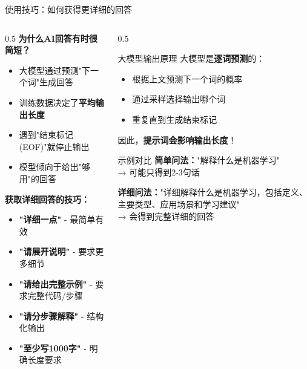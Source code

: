\documentclass[aspectratio=169,11pt]{beamer}
\begin{document}
\begin{frame}{使用技巧：如何获得更详细的回答}
    \begin{columns}
        \begin{column}{0.5\textwidth}
            \textbf{为什么AI回答有时很简短？}
            \begin{itemize}
                \item 大模型通过预测"下一个词"生成回答
                \item 训练数据决定了\textbf{平均输出长度}
                \item 遇到"结束标记(EOF)"就停止输出
                \item 模型倾向于给出"够用"的回答
            \end{itemize}
            
            \vspace{0.3cm}
            \textbf{\textcolor{green!60!black}{获取详细回答的技巧：}}
            \begin{itemize}
                \item \textbf{"详细一点"} - 最简单有效
                \item \textbf{"请展开说明"} - 要求更多细节
                \item \textbf{"请给出完整示例"} - 要求完整代码/步骤
                \item \textbf{"请分步骤解释"} - 结构化输出
                \item \textbf{"至少写1000字"} - 明确长度要求
            \end{itemize}
        \end{column}
        \begin{column}{0.5\textwidth}
            \begin{alertblock}{大模型输出原理}
                大模型是\textbf{逐词预测}的：
                \begin{itemize}
                    \item 根据上文预测下一个词的概率
                    \item 通过采样选择输出哪个词
                    \item 重复直到生成结束标记
                \end{itemize}
                因此，\textbf{提示词会影响输出长度}！
            \end{alertblock}
            
            \vspace{0.2cm}
            \begin{exampleblock}{示例对比}
                \small
                \textbf{简单问法：}"解释什么是机器学习"\\
                → 可能只得到2-3句话
                
                \vspace{0.2cm}
                \textbf{详细问法：}"详细解释什么是机器学习，包括定义、主要类型、应用场景和学习建议"\\
                → 会得到完整详细的回答
            \end{exampleblock}
        \end{column}
    \end{columns}
\end{frame}
\end{document}
